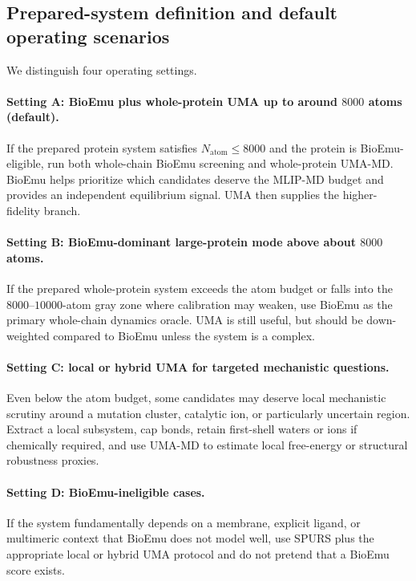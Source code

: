 \documentclass[11pt]{article}
\begin{document}
	\subsection{Prepared-system definition and default operating scenarios}
	
	We distinguish four operating settings.
	
	\paragraph{Setting A: BioEmu plus whole-protein UMA up to around $8000$ atoms (default).}
	If the prepared protein system satisfies $N_{\mathrm{atom}}\leq 8000$ and the protein is BioEmu-eligible, run both whole-chain BioEmu screening and whole-protein UMA-MD. BioEmu helps prioritize which candidates deserve the MLIP-MD budget and provides an independent equilibrium signal. UMA then supplies the higher-fidelity branch.
	
	\paragraph{Setting B: BioEmu-dominant large-protein mode above about $8000$ atoms.}
	If the prepared whole-protein system exceeds the atom budget or falls into the $8000$--$10000$-atom gray zone where calibration may weaken, use BioEmu as the primary whole-chain dynamics oracle. UMA is still useful, but should be down-weighted compared to BioEmu unless the system is a complex. 
	
	\paragraph{Setting C: local or hybrid UMA for targeted mechanistic questions.}
	Even below the atom budget, some candidates may deserve local mechanistic scrutiny around a mutation cluster, catalytic ion, or particularly uncertain region. Extract a local subsystem, cap bonds, retain first-shell waters or ions if chemically required, and use UMA-MD to estimate local free-energy or structural robustness proxies.
	
	\paragraph{Setting D: BioEmu-ineligible cases.}
	If the system fundamentally depends on a membrane, explicit ligand, or multimeric context that BioEmu does not model well, use SPURS plus the appropriate local or hybrid UMA protocol and do not pretend that a BioEmu score exists.
	
\end{document}

